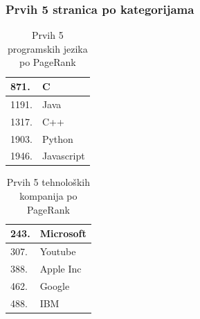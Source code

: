 \documentclass[11pt]{beamer}
\begin{document}
\begin{frame}
     \frametitle{Prvih 5 stranica po kategorijama}
    \begin{table}[]
    \large
    \centering
    \begin{tabular}{|l|l|}
    \hline
    871.                 & C                            \\ \hline
    1191.                 & Java                         \\ \hline
    1317.                 & C++                \\ \hline
    1903.                 & Python                     \\ \hline
    1946.                 & Javascript \\ \hline
    \end{tabular}
    \caption{Prvih 5 programskih jezika po PageRank}
    \label{tabelaprogramskijezici5}
    \end{table}
    
    \begin{table}[]
    \large
    \centering
    \begin{tabular}{|l|l|}
    \hline
    243.                 & Microsoft                            \\ \hline
    307.                 & Youtube                         \\ \hline
    388.                 & Apple Inc                \\ \hline
    462.                 & Google                     \\ \hline
    488.                 & IBM \\ \hline
    \end{tabular}
    \caption{Prvih 5 tehnoloških kompanija po PageRank}
    \label{tabelatehnoloskih5}
    \end{table}

\end{frame}
\end{document}
